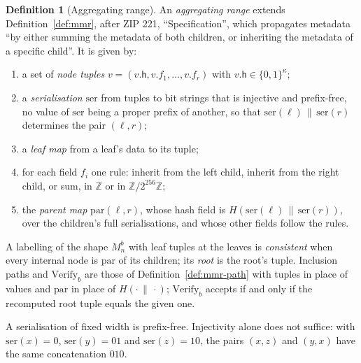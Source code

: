 \documentclass[11pt,a4paper]{article}
\theoremstyle{definition}
\newtheorem{definition}[theorem]{Definition}
\newcommand{\Z}{\mathbb{Z}}
\begin{document}
\begin{definition}[Aggregating range]\label{def:aggregating}
An \emph{aggregating range} extends Definition~\ref{def:mmr}, after ZIP 221,
``Specification'', which propagates metadata ``by either summing the metadata
of both children, or inheriting the metadata of a specific child''. It is
given by:
\begin{enumerate}
\item a set of \emph{node tuples} $v=(v.\mathsf{h},v.f_1,\dots,v.f_r)$ with
  $v.\mathsf{h}\in\{0,1\}^\kappa$;
\item a \emph{serialisation} $\mathrm{ser}$ from tuples to bit strings that is
  injective and prefix-free, no value of $\mathrm{ser}$ being a proper prefix
  of another, so that $\mathrm{ser}(\ell)\,\|\,\mathrm{ser}(r)$ determines the
  pair $(\ell,r)$;
\item a \emph{leaf map} from a leaf's data to its tuple;
\item for each field $f_i$ one rule: inherit from the left child, inherit
  from the right child, or sum, in $\Z$ or in $\Z/2^{256}\Z$;
\item the \emph{parent map} $\mathrm{par}(\ell,r)$, whose hash field is
  $H(\mathrm{ser}(\ell)\,\|\,\mathrm{ser}(r))$, over the children's full
  serialisations, and whose other fields follow the rules.
\end{enumerate}
A labelling of the shape $M^b_n$ with leaf tuples at the leaves is
\emph{consistent} when every internal node is $\mathrm{par}$ of its
children; its \emph{root} is the root's tuple. Inclusion paths and
$\mathrm{Verify}_b$ are those of Definition~\ref{def:mmr-path} with tuples in
place of values and $\mathrm{par}$ in place of $H(\cdot\,\|\,\cdot)$;
$\mathrm{Verify}_b$ accepts if and only if the recomputed root tuple equals
the given one.
\end{definition}

A serialisation of fixed width is prefix-free. Injectivity alone does not
suffice: with $\mathrm{ser}(x)=0$, $\mathrm{ser}(y)=01$ and
$\mathrm{ser}(z)=10$, the pairs $(x,z)$ and $(y,x)$ have the same
concatenation $010$.
\end{document}
